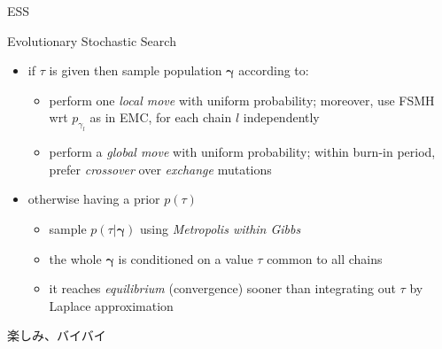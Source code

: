 \documentclass{beamer}
\newcommand{\vect}[1]{\boldsymbol{#1}}
\begin{document}
\begin{frame}{ESS}
\begin{block}{Evolutionary Stochastic Search}
    \begin{itemize}
        \item if $\tau$ is given then sample population $\vect{\gamma}$ according to: 
            \begin{itemize}
                \item perform one \emph{local move} with uniform probability; moreover, 
                    use FSMH wrt $p_{\gamma_{l}}$ as in EMC, for each chain $l$ independently
                \item perform a \emph{global move} with uniform probability; within burn-in period, prefer
                    \emph{crossover} over \emph{exchange} mutations 
            \end{itemize}
        \item otherwise having a prior $p(\tau)$ 
            \begin{itemize}
                \item sample $p(\tau|\vect{\gamma})$ using \emph{Metropolis within Gibbs}
                \item the whole $\vect{\gamma}$ is conditioned on a value $\tau$ common to all chains
                \item it reaches \emph{equilibrium} (convergence) sooner than integrating out $\tau$ by Laplace approximation
            \end{itemize}
    \end{itemize}
\end{block}
\end{frame}


\begin{frame}{ }
\Huge
\begin{CJK}{UTF8}{min}
楽しみ、バイバイ
\end{CJK}
\end{frame}
\end{document}
